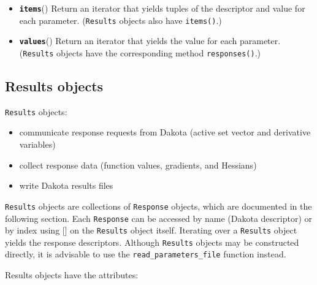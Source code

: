 \begin{itemize}
  \item{}
	  \label{index:dakota.interfacing.Parameters.items}\textbf{\texttt{items}}{()}{}
          Return an iterator that yields tuples of the descriptor and value for each parameter. ({\tt Results} objects also have {\tt items()}.)

  \item{}
	  \label{index:dakota.interfacing.Parameters.values}\textbf{\texttt{values}}{()}{}
          Return an iterator that yields the value for each parameter. ({\tt Results} objects have the corresponding method {\tt responses()}.)

\end{itemize}

\subsection{Results objects}

{\tt Results} objects:
\begin{itemize}

  \item communicate response requests from Dakota (active set vector and derivative variables)
  \item collect response data (function values, gradients, and Hessians)
  \item write Dakota results files
\end{itemize}

{\tt Results} objects are collections of {\tt Response} objects, which are documented in the following section. Each {\tt Response} can be accessed by name (Dakota descriptor) or by index using {[}{]} on the {\tt Results} object itself. Iterating over a {\tt Results} object yields the response descriptors. Although {\tt Results} objects may be constructed directly, it is advisable to use the {\tt read\_parameters\_file} function instead.

Results objects have the attributes:

